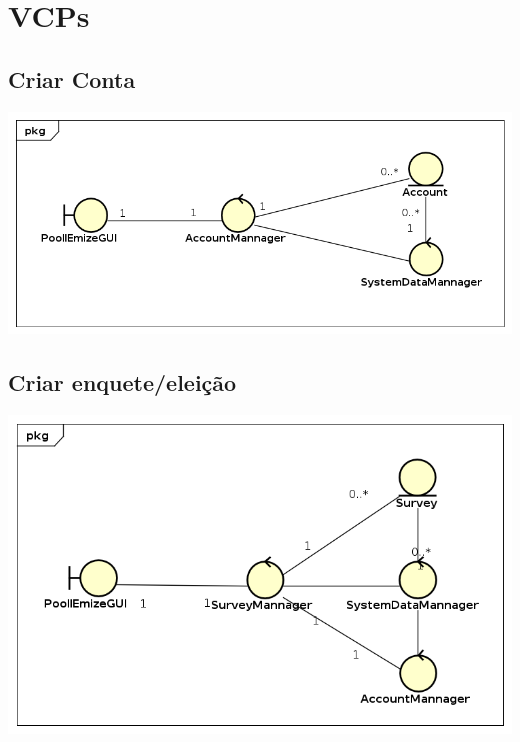\documentclass[a4paper,12pt]{report}
\begin{document}
\section*{VCPs}
\markright{}

\subsection*{Criar Conta}
\markright{}
\includegraphics[width=14.3cm]{class_diagrams/VCPCriarConta.png}

\subsection*{Criar enquete/eleição}
\markright{}
\includegraphics[width=14.3cm]{class_diagrams/VCPCriarEnquete.png}
\end{document}
